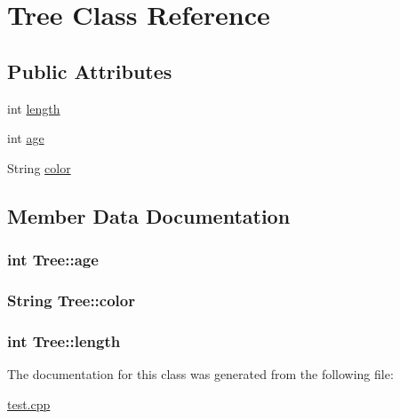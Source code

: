 \hypertarget{class_tree}{}\section{Tree Class Reference}
\label{class_tree}
\subsection*{Public Attributes}
\begin{DoxyCompactItemize}
\item 
int \hyperlink{class_tree_abd2590a324518ea612aeeebd16ca3b19}{length}
\item 
int \hyperlink{class_tree_a3d0cd7d1678ec25f497ae18a8da84f6b}{age}
\item 
String \hyperlink{class_tree_a3831da9232538d64dbe861ecc8428cc3}{color}
\end{DoxyCompactItemize}


\subsection{Member Data Documentation}
\subsubsection[{\texorpdfstring{age}{age}}]{\setlength{\rightskip}{0pt plus 5cm}int Tree\+::age}\hypertarget{class_tree_a3d0cd7d1678ec25f497ae18a8da84f6b}{}\label{class_tree_a3d0cd7d1678ec25f497ae18a8da84f6b}
\subsubsection[{\texorpdfstring{color}{color}}]{\setlength{\rightskip}{0pt plus 5cm}String Tree\+::color}\hypertarget{class_tree_a3831da9232538d64dbe861ecc8428cc3}{}\label{class_tree_a3831da9232538d64dbe861ecc8428cc3}
\subsubsection[{\texorpdfstring{length}{length}}]{\setlength{\rightskip}{0pt plus 5cm}int Tree\+::length}\hypertarget{class_tree_abd2590a324518ea612aeeebd16ca3b19}{}\label{class_tree_abd2590a324518ea612aeeebd16ca3b19}


The documentation for this class was generated from the following file\+:\begin{DoxyCompactItemize}
\item 
\hyperlink{test_8cpp}{test.\+cpp}\end{DoxyCompactItemize}
